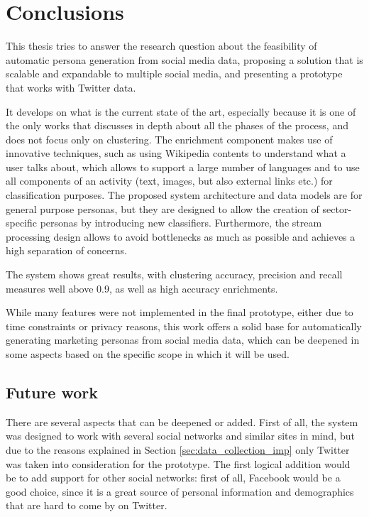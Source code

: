 \chapter{Conclusions}
\label{cha:conclusions}
This thesis tries to answer the research question about the feasibility of automatic persona generation from social media data, proposing a solution that is scalable and expandable to multiple social media, and presenting a prototype that works with Twitter data.

It develops on what is the current state of the art, especially because it is one of the only works that discusses in depth about all the phases of the process, and does not focus only on clustering. The enrichment component makes use of innovative techniques, such as using Wikipedia contents to understand what a user talks about, which allows to support a large number of languages and to use all components of an activity (text, images, but also external links etc.) for classification purposes. The proposed system architecture and data models are for general purpose personas, but they are designed to allow the creation of sector-specific personas by introducing new classifiers. Furthermore, the stream processing design allows to avoid bottlenecks as much as possible and achieves a high separation of concerns.

The system shows great results, with clustering accuracy, precision and recall measures well above 0.9, as well as high accuracy enrichments.

While many features were not implemented in the final prototype, either due to time constraints or privacy reasons, this work offers a solid base for automatically generating marketing personas from social media data, which can be deepened in some aspects based on the specific scope in which it will be used.

\section{Future work}
There are several aspects that can be deepened or added. First of all, the system was designed to work with several social networks and similar sites in mind, but due to the reasons explained in Section \ref{sec:data_collection_imp} only Twitter was taken into consideration for the prototype. The first logical addition would be to add support for other social networks: first of all, Facebook would be a good choice, since it is a great source of personal information and demographics that are hard to come by on Twitter.

